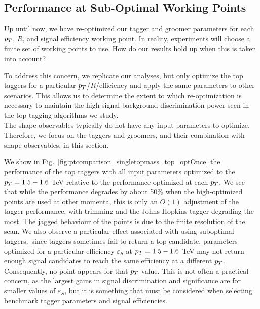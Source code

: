 
\clearpage
\subsection{Performance at Sub-Optimal Working Points}

Up until now, we have re-optimized our tagger and groomer parameters for each $p_T$, $R$, and signal efficiency working point. In reality, experiments will choose a finite set of working points to use. How do our results hold up when this is taken into account?

To address this concern, we replicate our analyses, but only optimize the top taggers for a particular $p_T$/$R$/efficiency and apply the same parameters to other scenarios. This allows us to determine the extent to which re-optimization is necessary to maintain the high signal-background discrimination power seen in the top tagging algorithms we study.\\

The shape observables typically do not have any input parameters to optimize. Therefore, we focus on the taggers and groomers, and their combination with shape observables, in this section.

We show in Fig.~\ref{fig:ptcomparison_singletopmass_top_optOnce} the performance of the top taggers with all input parameters optimized to the $p_T=1.5-1.6$ TeV relative to the performance optimized at each $p_T$. We see that while the performance degrades by about 50\% when the high-\pt optimized points are used at other momenta, this is only an $O(1)$ adjustment of the tagger performance, with trimming and the Johns Hopkins tagger degrading the most. The jagged behaviour of the points is due to the finite resolution of the scan. We also observe a particular effect associated with using suboptimal taggers:~since taggers sometimes fail to return a top candidate, parameters optimized for a particular efficiency $\varepsilon_S$ at $p_T=1.5-1.6$ TeV may not return enough signal candidates to reach the same efficiency at a different $p_T$. Consequently, no point appears for that $p_T$ value. This is not often a practical concern, as the largest gains in signal discrimination and significance are for smaller values of $\varepsilon_S$, but it is something that must be considered when selecting benchmark tagger parameters and signal efficiencies.

